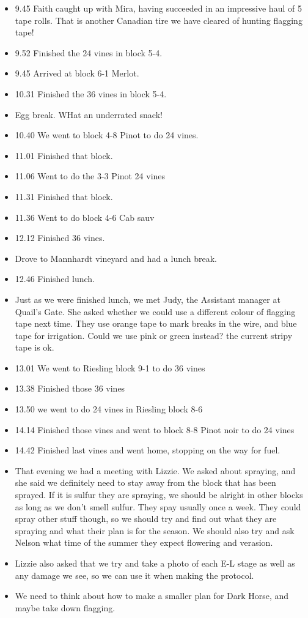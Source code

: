 \documentclass[11pt,letter]{article}
\newenvironment{smitemize}{
\begin{itemize}
  \setlength{\itemsep}{0pt}
  \setlength{\parskip}{0.8pt}
  \setlength{\parsep}{0pt}}
{\end{itemize}
}
\begin{document}
\begin{smitemize}
\item 9.45 Faith caught up with Mira, having succeeded in an impressive haul of 5 tape rolls. That is another Canadian tire we have cleared of hunting flagging tape!
\item 9.52 Finished the 24 vines in block 5-4.
\item 9.45 Arrived at block 6-1 Merlot.
\item 10.31 Finished the 36 vines in block 5-4.
\item Egg break. WHat an underrated snack!
\item 10.40 We went to block 4-8 Pinot to do 24 vines.
\item 11.01 Finished that block.
\item 11.06 Went to do the 3-3 Pinot 24 vines
\item 11.31 Finished that block. 
\item 11.36 Went to do block 4-6 Cab sauv
\item 12.12 Finished 36 vines. 
\item Drove to Mannhardt vineyard and had a lunch break.
\item 12.46 Finished lunch.
\item Just as we were finished lunch, we met Judy, the Assistant manager at Quail's Gate. She asked whether we could use a different colour of flagging tape next time. They use orange tape to mark breaks in the wire, and blue tape for irrigation. Could we use pink or green instead? the current stripy tape is ok. 
\item 13.01 We went to Riesling block 9-1 to do 36 vines
\item 13.38 Finished those 36 vines
\item 13.50 we went to do 24 vines in Riesling block 8-6
\item 14.14 Finished those vines and went to block 8-8 Pinot noir to do 24 vines
\item 14.42 Finished last vines and went home, stopping on the way for fuel.

\item That evening we had a meeting with Lizzie. We asked about spraying, and she said we definitely need to stay away from the block that has been sprayed. If it is sulfur they are spraying, we should be alright in other blocks as long as we don't smell sulfur. They spay usually once a week. They could spray other stuff though, so we should try and find out what they are spraying and what their plan is for the season. We should also try and ask Nelson what time of the summer they expect flowering and verasion. 
\item Lizzie also asked that we try and take a photo of each E-L stage as well as any damage we see, so we can use it when making the protocol.
\item We need to think about how to make a smaller plan for Dark Horse, and maybe take down flagging.

\end{smitemize}
\end{document}
